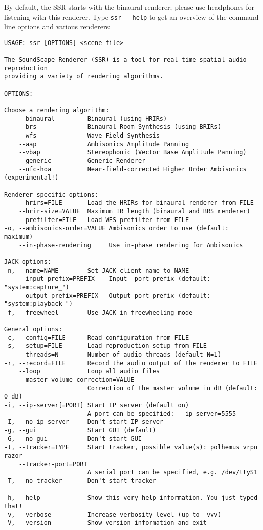 By default, the SSR starts with the binaural renderer; please use
headphones for listening with this renderer.
Type \verb+ssr --help+ to get an overview of the command
line options and various renderers:

{\footnotesize
\begin{verbatim}
USAGE: ssr [OPTIONS] <scene-file>

The SoundScape Renderer (SSR) is a tool for real-time spatial audio reproduction
providing a variety of rendering algorithms.

OPTIONS:

Choose a rendering algorithm:
    --binaural         Binaural (using HRIRs)
    --brs              Binaural Room Synthesis (using BRIRs)
    --wfs              Wave Field Synthesis
    --aap              Ambisonics Amplitude Panning
    --vbap             Stereophonic (Vector Base Amplitude Panning)
    --generic          Generic Renderer
    --nfc-hoa          Near-field-corrected Higher Order Ambisonics (experimental!)

Renderer-specific options:
    --hrirs=FILE       Load the HRIRs for binaural renderer from FILE
    --hrir-size=VALUE  Maximum IR length (binaural and BRS renderer)
    --prefilter=FILE   Load WFS prefilter from FILE
-o, --ambisonics-order=VALUE Ambisonics order to use (default: maximum)
    --in-phase-rendering     Use in-phase rendering for Ambisonics

JACK options:
-n, --name=NAME        Set JACK client name to NAME
    --input-prefix=PREFIX    Input  port prefix (default: "system:capture_")
    --output-prefix=PREFIX   Output port prefix (default: "system:playback_")
-f, --freewheel        Use JACK in freewheeling mode

General options:
-c, --config=FILE      Read configuration from FILE
-s, --setup=FILE       Load reproduction setup from FILE
    --threads=N        Number of audio threads (default N=1)
-r, --record=FILE      Record the audio output of the renderer to FILE
    --loop             Loop all audio files
    --master-volume-correction=VALUE
                       Correction of the master volume in dB (default: 0 dB)
-i, --ip-server[=PORT] Start IP server (default on)
                       A port can be specified: --ip-server=5555
-I, --no-ip-server     Don't start IP server
-g, --gui              Start GUI (default)
-G, --no-gui           Don't start GUI
-t, --tracker=TYPE     Start tracker, possible value(s): polhemus vrpn razor
    --tracker-port=PORT
                       A serial port can be specified, e.g. /dev/ttyS1
-T, --no-tracker       Don't start tracker

-h, --help             Show this very help information. You just typed that!
-v, --verbose          Increase verbosity level (up to -vvv)
-V, --version          Show version information and exit
\end{verbatim}
}

